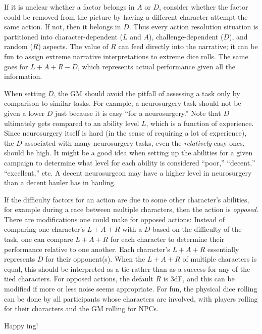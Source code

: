 If it is unclear whether a factor belongs in $A$ or $D$, consider whether the factor could be removed from the picture by having a different character attempt the same action. If not, then it belongs in $D$.
Thus every action resolution situation is partitioned into
character-dependent ($L$ and $A$), challenge-dependent ($D$), and random ($R$) aspects.
The value of $R$ can feed directly into the narrative; it can be fun to assign extreme narrative interpretations to extreme dice rolls.
The same goes for $L + A + R - D$, which represents actual performance given all the information.


When setting $D$, the GM should avoid the pitfall of assessing a task only by comparison to similar tasks.
For example, a neurosurgery task should not be given a lower $D$ just because it is easy ``for a neurosurgery.''
Note that $D$ ultimately gets compared to an ability level $L$, which is a function of experience.
Since neurosurgery itself is hard (in the sense of requiring a lot of experience), the $D$ associated with many neurosurgery tasks, even the \emph{relatively} easy ones, should be high.
It might be a good idea when setting up the abilities for a given campaign to determine what level for each ability is considered ``poor,'' ``decent,'' ``excellent,'' etc.
A decent neurosurgeon may have a higher level in neurosurgery than a decent hauler has in hauling.

If the difficulty factors for an action are due to some other character’s abilities, for example during a race between multiple characters, then the action is \emph{opposed}. There are modifications one could make for opposed actions: Instead of comparing one character’s $L + A + R$ with a $D$ based on the difficulty of the task, one can compare $L + A + R$ for each character to determine their performance relative to one another. Each character's $L + A + R$ essentially represents $D$ for their opponent(s). When the $L + A + R$ of multiple characters is equal, this should be interpreted as a tie rather than as a success for any of the tied characters. For opposed actions, the default $R$ is $3$dF, and this can be modified if more or less noise seems appropriate. For fun, the physical dice rolling can be done by all participants whose characters are involved, with players rolling for their characters and the GM rolling for NPCs.

Happy \peupfudge{}ing!


